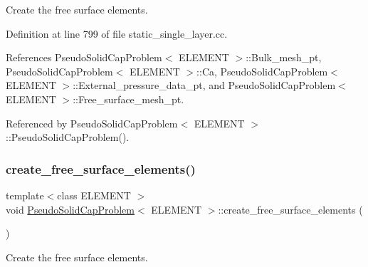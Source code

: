 Create the free surface elements. 



Definition at line 799 of file static\+\_\+single\+\_\+layer.\+cc.



References Pseudo\+Solid\+Cap\+Problem$<$ E\+L\+E\+M\+E\+N\+T $>$\+::\+Bulk\+\_\+mesh\+\_\+pt, Pseudo\+Solid\+Cap\+Problem$<$ E\+L\+E\+M\+E\+N\+T $>$\+::\+Ca, Pseudo\+Solid\+Cap\+Problem$<$ E\+L\+E\+M\+E\+N\+T $>$\+::\+External\+\_\+pressure\+\_\+data\+\_\+pt, and Pseudo\+Solid\+Cap\+Problem$<$ E\+L\+E\+M\+E\+N\+T $>$\+::\+Free\+\_\+surface\+\_\+mesh\+\_\+pt.



Referenced by Pseudo\+Solid\+Cap\+Problem$<$ E\+L\+E\+M\+E\+N\+T $>$\+::\+Pseudo\+Solid\+Cap\+Problem().

\mbox{\label{classPseudoSolidCapProblem_ac0219ed64385dc20c4fc3c6cc217fd67}} 
\subsubsection{\texorpdfstring{create\+\_\+free\+\_\+surface\+\_\+elements()}{create\_free\_surface\_elements()}\hspace{0.1cm}{\footnotesize\ttfamily [2/2]}}
{\footnotesize\ttfamily template$<$class E\+L\+E\+M\+E\+NT $>$ \\
void \hyperlink{classPseudoSolidCapProblem}{Pseudo\+Solid\+Cap\+Problem}$<$ E\+L\+E\+M\+E\+NT $>$\+::create\+\_\+free\+\_\+surface\+\_\+elements (\begin{DoxyParamCaption}{ }\end{DoxyParamCaption})\hspace{0.3cm}{\ttfamily [private]}}



Create the free surface elements. 

\mbox{\label{classPseudoSolidCapProblem_a0289801610e2bc864c67d4d8557d56b1}} 
